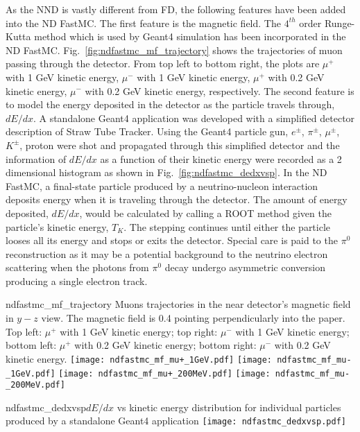 As the NND is vastly different from FD, the following features have been added into the ND FastMC.
The first feature is the magnetic field. The $4^{th}$ order Runge-Kutta method which is used by Geant4 simulation has
been incorporated in the ND FastMC. Fig.~\ref{fig:ndfastmc_mf_trajectory} shows the trajectories of muon passing through
the detector. From top left to bottom right, the plots are $\mu^+$ with 1 GeV kinetic energy, $\mu^-$ with 1 GeV kinetic energy,
$\mu^+$ with 0.2 GeV kinetic energy, $\mu^-$ with 0.2 GeV kinetic energy, respectively.
The second feature is to model the energy deposited in the detector as the particle travels through, $dE/dx$.
A standalone Geant4 application was developed with a simplified detector description of Straw Tube Tracker. 
Using the Geant4 particle gun, $e^\pm$, $\pi^\pm$, $\mu^\pm$, $K^\pm$, proton were shot and propagated through
this simplified detector and the information of $dE/dx$ as a function of their kinetic energy were
recorded as a 2 dimensional histogram as shown in Fig.~\ref{fig:ndfastmc_dedxvsp}. In the ND FastMC,
a final-state particle produced by a neutrino-nucleon interaction deposits energy when it is traveling through the detector.
The amount of energy deposited, $dE/dx$, would be calculated by calling a ROOT method given the particle's kinetic energy, $T_K$.
The stepping continues until either the particle looses all its energy and stops or exits the detector.
Special care is paid to the $\pi^0$ reconstruction as it may be a potential background to the neutrino electron scattering when the photons
from $\pi^0$ decay undergo asymmetric conversion producing a single electron track.

\begin{cdrfigure}{ndfastmc_mf_trajectory}
  {Muons trajectories in the near detector's magnetic field in $y-z$ view.
    The magnetic field is 0.4 pointing perpendicularly into the paper.    
    Top left: $\mu^+$ with 1 GeV kinetic energy; top right: $\mu^-$ with 1 GeV kinetic energy;
    bottom left: $\mu^+$ with 0.2 GeV kinetic energy; bottom right: $\mu^-$ with 0.2 GeV kinetic energy.}
  \texttt{[image: ndfastmc\_mf\_mu+\_1GeV.pdf]}
  \texttt{[image: ndfastmc\_mf\_mu-\_1GeV.pdf]}
  \texttt{[image: ndfastmc\_mf\_mu+\_200MeV.pdf]}
  \texttt{[image: ndfastmc\_mf\_mu-\_200MeV.pdf]}
\end{cdrfigure}

\begin{cdrfigure}
  {ndfastmc_dedxvsp}{$dE/dx$ vs kinetic energy distribution for individual particles produced by a standalone Geant4 application}
\texttt{[image: ndfastmc\_dedxvsp.pdf]}
\end{cdrfigure}

